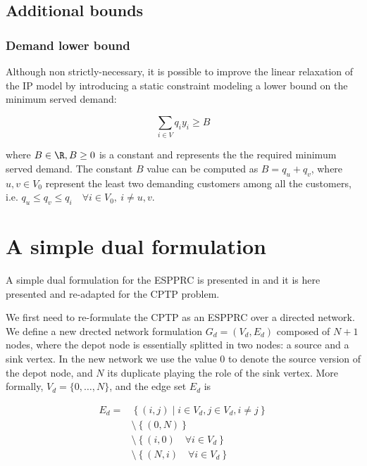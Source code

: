 \subsection{Additional bounds}

\subsubsection{Demand lower bound}\label{sec:demand-lower-bound}
Although non strictly-necessary, it is possible to improve the linear relaxation of the IP model by introducing a static constraint modeling a lower bound on the minimum served demand:

\begin{equation}\label{eq:resource-lower-bound-constraint}
	\sum_{i \in V} q_i y_i   \ge B
\end{equation}

where $B \in \R, B \ge 0$ is a constant and represents the the required minimum served demand.
The constant $B$ value can be computed as $B = q_u + q_v$, where $u, v \in V_0$ represent the least two demanding customers among all the customers, i.e. $q_u \le q_v \le q_i \quad \forall i \in V_0,\ i \ne u, v$.

\section{A simple dual formulation}\label{sec:cptp-simple-dual-formulation}

A simple dual formulation for the ESPPRC is presented in \cite{beasley1989algorithm} and it is here presented and re-adapted for the CPTP problem.

We first need to re-formulate the CPTP as an ESPPRC over a directed network.
We define a new drected network formulation $G_d = (V_d, E_d)$ composed of $N + 1$ nodes, where the depot node is essentially splitted in two nodes: a source and a sink vertex.
In the new network we use the value $0$ to denote the source version of the depot node, and $N$ its duplicate playing the role of the sink vertex.
More formally, $V_d = \{ 0, \dots, N  \}$, and the edge set $E_d$ is

\begin{equation}
	\begin{aligned}
		E_d = & \left\{ (i, j) \mid i \in V_d, j \in V_d, i \ne j \right\} \\
		      & \setminus \left\{ (0, N) \right\}                          \\
		      & \setminus \left\{ (i, 0) \quad \forall i \in V_d \right\}  \\
		      & \setminus \left\{ (N, i) \quad \forall i \in V_d \right\}  \\
	\end{aligned}
\end{equation}

